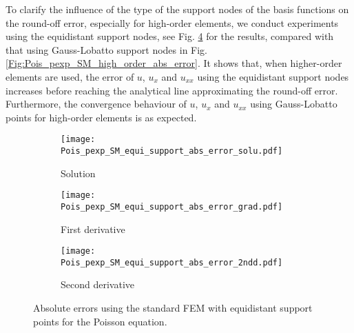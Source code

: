 \documentclass[final,3p]{elsarticle}
\begin{document}
To clarify the influence of the type of the support nodes of the basis functions on the round-off error, especially for high-order elements, we conduct experiments using the equidistant support nodes, see Fig. \ref{Fig:Pois_pexp_SM_equi_support_abs_error} for the results, compared with that using Gauss-Lobatto support nodes in Fig. \ref{Fig:Pois_pexp_SM_high_order_abs_error}. It shows that, when higher-order elements are used, the error of $u$, $u_{x}$ and $u_{xx}$ using the equidistant support nodes increases before reaching the analytical line approximating the round-off error.
Furthermore, the convergence behaviour of $u$, $u_{x}$ and $u_{xx}$ using Gauss-Lobatto points for high-order elements is as expected. 

\begin{figure}[!ht]
    \begin{subfigure}{5.5cm}
        \texttt{[image: Pois\_pexp\_SM\_equi\_support\_abs\_error\_solu.pdf]}
        \caption{Solution}
        \label{Fig:Pois_pexp_SM_equi_support_abs_error_solu}
    \end{subfigure}
    \begin{subfigure}{5.5cm}
        \texttt{[image: Pois\_pexp\_SM\_equi\_support\_abs\_error\_grad.pdf]}
        \caption{First derivative}
        \label{Fig:Pois_pexp_SM_equi_support_abs_error_grad}
    \end{subfigure}
    \begin{subfigure}{5.5cm}
        \texttt{[image: Pois\_pexp\_SM\_equi\_support\_abs\_error\_2ndd.pdf]}
        \caption{Second derivative}
        \label{Fig:Pois_pexp_SM_equi_support_abs_error_2ndd}
    \end{subfigure}
\caption{Absolute errors using the standard FEM with equidistant support points for the Poisson equation.}
\label{Fig:Pois_pexp_SM_equi_support_abs_error}
\end{figure}
\end{document}
